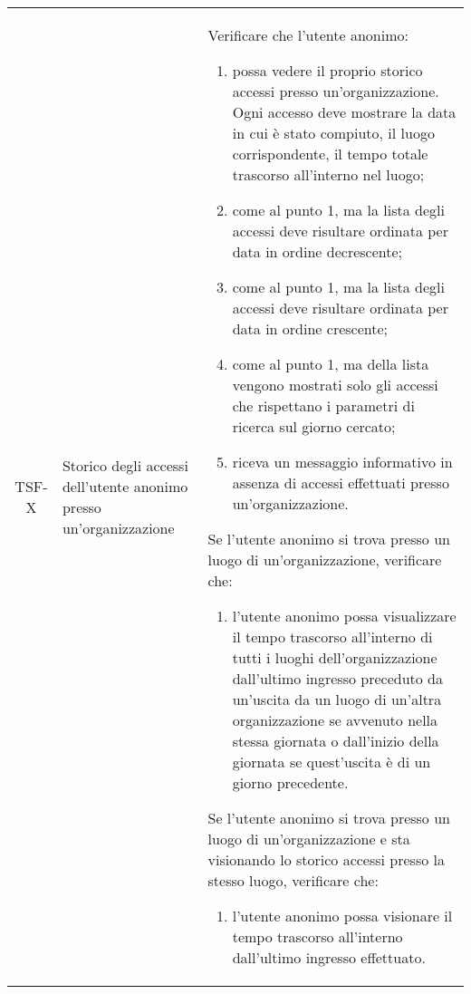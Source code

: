 {\begin{longtable}{ c | C{3cm} | C{11cm} }
TSF-X & Storico degli accessi dell'utente anonimo presso un'organizzazione & 
Verificare che l'utente anonimo:
\begin{enumerate}
    \item possa vedere il proprio storico accessi presso un'organizzazione. Ogni accesso deve mostrare la data in cui è stato compiuto, il luogo corrispondente, il tempo totale trascorso all'interno nel luogo;
    \item come al punto 1, ma la lista degli accessi deve risultare ordinata per data in ordine decrescente;
    \item come al punto 1, ma la lista degli accessi deve risultare ordinata per data in ordine crescente;
    \item come al punto 1, ma della lista vengono mostrati solo gli accessi che rispettano i parametri di ricerca sul giorno cercato;
    \item riceva un messaggio informativo in assenza di accessi effettuati presso un'organizzazione.
\end{enumerate}
Se l'utente anonimo si trova presso un luogo di un'organizzazione, verificare che:
\begin{enumerate}
    \item l'utente anonimo possa visualizzare il tempo trascorso all'interno di tutti i luoghi dell'organizzazione dall'ultimo ingresso preceduto da un'uscita da un luogo di un'altra organizzazione se avvenuto nella stessa giornata o dall'inizio della giornata se quest'uscita è di un giorno precedente. %
\end{enumerate}
Se l'utente anonimo si trova presso un luogo di un'organizzazione e sta visionando lo storico accessi presso la stesso luogo, verificare che:
\begin{enumerate}
    \item l'utente anonimo possa visionare il tempo trascorso all'interno dall'ultimo ingresso effettuato.
\end{enumerate} \\


\end{longtable}}

